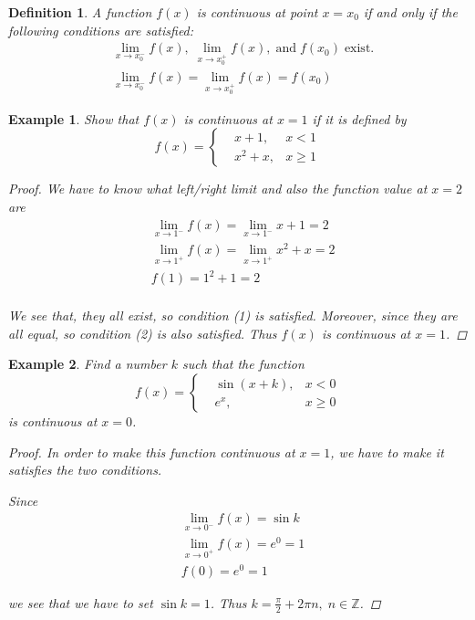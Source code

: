 \documentclass{article}
\newtheorem{definition}{Definition}
\newtheorem{ex}{Example}
\begin{document}
\begin{definition}
	A function $f(x)$ is continuous at point $x=x_0$ if and only if the following conditions are satisfied: 
	\begin{align}
	&\lim_{x\to x_0^-} f(x),\; \lim_{x\to x_0^+} f(x),\;\text{and}\; f(x_0)\; \text{exist}.\\
	&\lim_{x\to x_0^-} f(x)=\lim_{x\to x_0^+} f(x)=f(x_0)
	\end{align}
\end{definition}

\begin{ex}
	Show that $f(x)$ is continuous at $x=1$ if it is defined by
	\[ f(x) = \left\{ \begin{matrix}
	&x+1,\;&x<1 \\ &x^2+x,&x\geq 1 
	\end{matrix} \right. \]
	
	\begin{proof}
		We have to know what left/right limit and also the function value at $x=2$ are  
		\begin{align*}
		&\lim_{x\to 1^-} f(x) = \lim_{x\to 1^-} x+1 = 2\\
		&\lim_{x\to 1^+} f(x) = \lim_{x\to 1^+} x^2+x = 2\\
		&f(1) = 1^2 + 1 = 2\\
		\end{align*}
		 
		We see that, they all exist, so condition (1) is satisfied. Moreover, since they are all equal, so condition (2) is also satisfied. Thus $f(x)$ is continuous at $x=1$.
	\end{proof}
\end{ex}


\begin{ex}
	Find a number $k$ such that the function 
	\[ f(x) = \left\{ \begin{matrix}
	&\sin(x+k), &x<0\\ &e^x, &x\geq 0
	\end{matrix}  \right. \] 
	is continuous at $x=0$.
	
	
	\begin{proof}
		In order to make this function continuous at $x=1$, we have to make it satisfies the two conditions.
		
		Since 
		\begin{align*}
		&\lim_{x\to 0^-} f(x) = \sin k\\
		&\lim_{x\to 0^+} f(x) = e^0 = 1\\
		&f(0) = e^0 = 1
		\end{align*} 
		
		we see that we have to set $\sin k=1$. Thus $k=\frac{\pi}{2} + 2\pi n,\;n\in\mathbb{Z}$. 
	\end{proof}
\end{ex}
\end{document}

